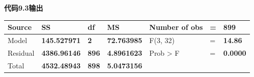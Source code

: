\documentclass[
  chinese-hans,
  letterpaper,
  DIV=11,
  numbers=noendperiod]{scrreprt}
\newcounter{none} %
\begin{document}
\begin{tcolorbox}[enhanced jigsaw, arc=.35mm, bottomrule=.15mm, breakable, colback=white, colframe=quarto-callout-note-color-frame, left=2mm, leftrule=.75mm, opacityback=0, rightrule=.15mm, toprule=.15mm]

\vspace{-3mm}\textbf{代码9.3输出}\vspace{3mm}

{\def\LTcaptype{none} %
\begin{longtable}[]{@{}
  >{\raggedleft\arraybackslash}p{}
  >{\centering\arraybackslash}p{}
  >{\centering\arraybackslash}p{}
  >{\centering\arraybackslash}p{}
  >{\raggedright\arraybackslash}p{}
  >{\centering\arraybackslash}p{}
  >{\centering\arraybackslash}p{}@{}}
\toprule\noalign{}
\begin{minipage}[b]{\linewidth}\raggedleft
Source
\end{minipage} & \begin{minipage}[b]{\linewidth}\centering
SS
\end{minipage} & \begin{minipage}[b]{\linewidth}\centering
df
\end{minipage} & \begin{minipage}[b]{\linewidth}\centering
MS
\end{minipage} & \begin{minipage}[b]{\linewidth}\raggedright
Number of obs
\end{minipage} & \begin{minipage}[b]{\linewidth}\centering
=
\end{minipage} & \begin{minipage}[b]{\linewidth}\centering
\textbf{899}
\end{minipage} \\
\midrule\noalign{}
\endhead
\bottomrule\noalign{}
\endlastfoot
Model & \textbf{145.527971} & \textbf{2} & \textbf{72.763985} & F(3, 32)
& = & \textbf{14.86} \\
Residual & \textbf{4386.96146} & \textbf{896} & \textbf{4.8961623} &
Prob \textgreater{} F & = & \textbf{0.0000} \\
Total & \textbf{4532.48943} & \textbf{898} & \textbf{5.0473156} &

\end{longtable}}
\end{tcolorbox}
\end{document}

